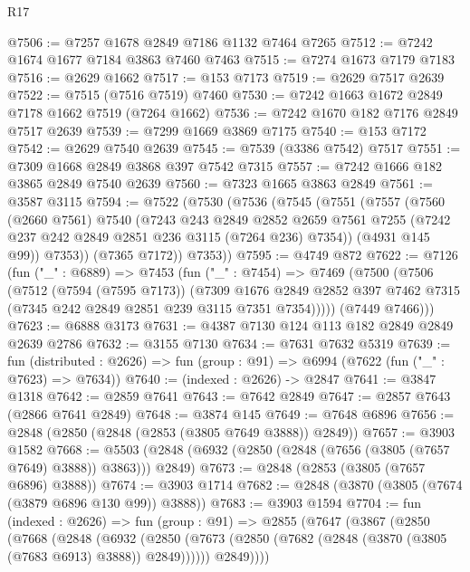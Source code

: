 \begin{lexlean}{R17}
\begin{coremodule}
@7506 := @7257 @1678 @2849 @7186 @1132 @7464 @7265
@7512 := @7242 @1674 @1677 @7184 @3863 @7460 @7463
@7515 := @7274 @1673 @7179 @7183
@7516 := @2629 @1662
@7517 := @153 @7173
@7519 := @2629 @7517 @2639
@7522 := @7515 (@7516 @7519) @7460
@7530 := @7242 @1663 @1672 @2849 @7178 @1662 @7519 (@7264 @1662)
@7536 := @7242 @1670 @182 @7176 @2849 @7517 @2639
@7539 := @7299 @1669 @3869 @7175
@7540 := @153 @7172
@7542 := @2629 @7540 @2639
@7545 := @7539 (@3386 @7542) @7517
@7551 := @7309 @1668 @2849 @3868 @397 @7542 @7315
@7557 := @7242 @1666 @182 @3865 @2849 @7540 @2639
@7560 := @7323 @1665 @3863 @2849
@7561 := @3587 @3115
@7594 := @7522
    (@7530
      (@7536
        (@7545
          (@7551
            (@7557
              (@7560
                (@2660 @7561)
                @7540
                (@7243
                  @243
                  @2849
                  @2852
                  @2659
                  @7561
                  @7255
                  (@7242 @237 @242 @2849 @2851 @236 @3115 (@7264 @236) @7354))
                (@4931 @145 @99))
              @7353))
          (@7365 @7172))
        @7353))
@7595 := @4749 @872
@7622 := @7126
    (fun ("_" : @6889) =>
    @7453
      (fun ("_" : @7454) =>
      @7469
        (@7500
          (@7506
            (@7512
              (@7594 (@7595 @7173))
              (@7309
                @1676
                @2849
                @2852
                @397
                @7462
                @7315
                (@7345 @242 @2849 @2851 @239 @3115 @7351 @7354)))))
        (@7449 @7466)))
@7623 := @6888 @3173
@7631 := @4387 @7130 @124 @113 @182 @2849 @2849 @2639 @2786
@7632 := @3155 @7130
@7634 := @7631 @7632 @5319
@7639 := fun (distributed : @2626) =>
  fun (group : @91) => @6994 (@7622 (fun ("_" : @7623) => @7634))
@7640 := (indexed : @2626) -> @2847
@7641 := @3847 @1318
@7642 := @2859 @7641
@7643 := @7642 @2849
@7647 := @2857 @7643 (@2866 @7641 @2849)
@7648 := @3874 @145
@7649 := @7648 @6896
@7656 := @2848 (@2850 (@2848 (@2853 (@3805 @7649 @3888)) @2849))
@7657 := @3903 @1582
@7668 := @5503 (@2848 (@6932 (@2850 (@2848 (@7656 (@3805 (@7657 @7649) @3888)) @3863))) @2849)
@7673 := @2848 (@2853 (@3805 (@7657 @6896) @3888))
@7674 := @3903 @1714
@7682 := @2848 (@3870 (@3805 (@7674 (@3879 @6896 @130 @99)) @3888))
@7683 := @3903 @1594
@7704 := fun (indexed : @2626) =>
  fun (group : @91) =>
  @2855
    (@7647
      (@3867
        (@2850
          (@7668
            (@2848
              (@6932
                (@2850 (@7673 (@2850 (@7682 (@2848 (@3870 (@3805 (@7683 @6913) @3888)) @2849))))))
              @2849))))

\end{coremodule}
\end{lexlean}
